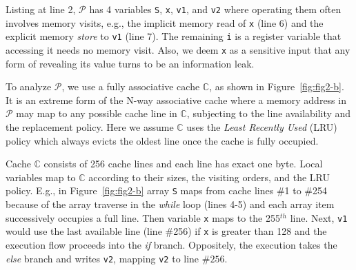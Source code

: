 \documentclass[sigconf, review]{acmart}
\newcommand{\prog}{\mathcal{P}}
\begin{document}
Listing at line 2, ${\prog}$ has 4 variables \texttt{S}, \texttt{x}, \texttt{v1}, 
and \texttt{v2} where operating them often involves memory visits, e.g., the 
implicit memory read of \texttt{x} (line 6) and the explicit memory \emph{store} 
to \texttt{v1} (line 7). The remaining \texttt{i} is a register variable that 
accessing it needs no memory visit. Also, we deem \texttt{x} as a sensitive input 
that any form of revealing its value turns to be an information leak. 


To analyze $\prog$, we use a fully associative cache $\mathbb{C}$, as shown in 
Figure~\ref{fig:fig2-b}. It is an extreme form of the N-way associative cache 
where a memory address in $\prog$ may map to any possible cache line in $\mathbb{C}$,
subjecting to the line availability and the replacement policy. Here we assume 
$\mathbb{C}$ uses the \emph{Least Recently Used} (LRU) policy which always
evicts the oldest line once the cache is fully occupied.


Cache $\mathbb{C}$ consists of 256 cache lines and each line has exact one byte. 
Local variables map to $\mathbb{C}$ according to their sizes, the visiting orders, 
and the LRU policy. E.g., in Figure~\ref{fig:fig2-b} array \texttt{S} maps from 
cache lines \#1 to \#254 because of the array traverse in the \emph{while} loop 
(lines 4-5) and each array item successively occupies a full line. Then variable
\texttt{x} maps to the 255$^{\mathit{th}}$ line. Next, \texttt{v1} would use the 
last available line (line \#256) if \texttt{x} is greater than 128 and the execution
flow proceeds into the \textit{if} branch. Oppositely, the execution takes the 
\textit{else} branch and writes \texttt{v2}, mapping \texttt{v2} to line $\#256$.
\end{document}
